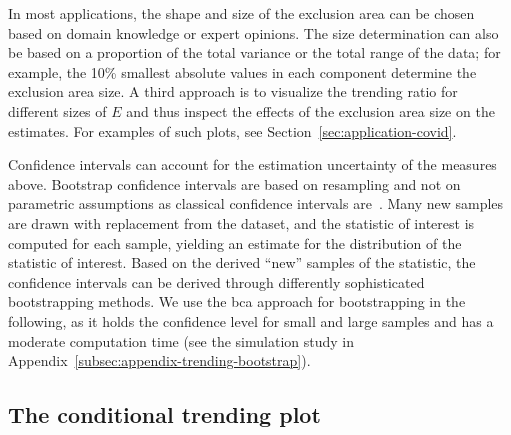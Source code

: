 \documentclass[pdflatex]{sn-jnl}
\theoremstyle{plain}%
\theoremstyle{definition}
\begin{document}
In most applications, the shape and size of the exclusion area can be chosen based on domain knowledge or expert opinions.
The size determination can also be based on a proportion of the total variance or the total range of the data; for example, the 10\% smallest absolute values in each component determine the exclusion area size.
A third approach is to visualize the trending ratio for different sizes of $E$ and thus inspect the effects of the exclusion area size on the estimates.
For examples of such plots, see Section~\ref{sec:application-covid}.

Confidence intervals can account for the estimation uncertainty of the measures above.
Bootstrap confidence intervals are based on resampling and not on parametric assumptions as classical confidence intervals are~\parencite[for introductions see][]{Hesterberg2011,Bittmann2021}.
Many new samples are drawn with replacement from the dataset, and the statistic of interest is computed for each sample, yielding an estimate for the distribution of the statistic of interest.
Based on the derived \enquote{new} samples of the statistic, the confidence intervals can be derived through differently sophisticated bootstrapping methods.
We use the \ac{bca} approach for bootstrapping in the following, as it holds the confidence level for small and large samples and has a moderate computation time (see the simulation study in Appendix~\ref{subsec:appendix-trending-bootstrap}).


\subsection{The conditional trending plot}\label{subsec:trending-cond-prob}
\end{document}
